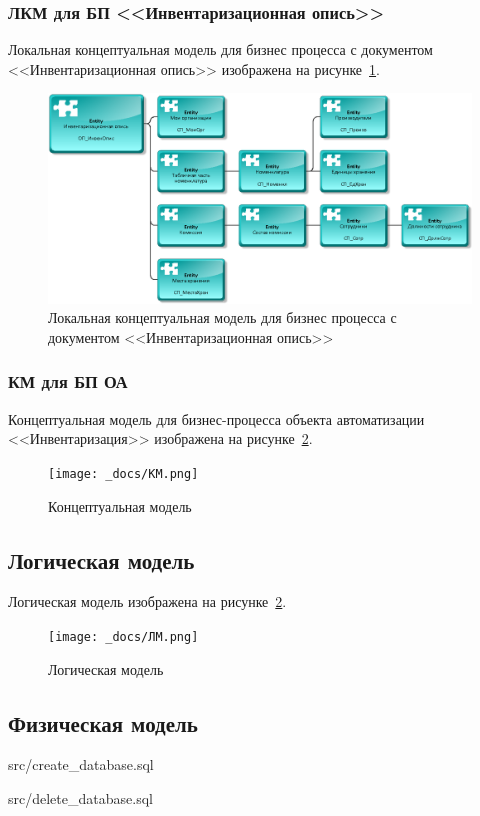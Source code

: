 \newpage

\subsubsection{ЛКМ для БП <<Инвентаризационная опись>>}

Локальная концептуальная модель для бизнес процесса с документом <<Инвентаризационная опись>>
изображена на рисунке~\ref{fig:LKM_InvenOpis}.

\begin{figure}[!h]
    \centering
    \includegraphics[width=18cm]
        {_docs/ЛКМ_ИнвенОпис.png}
    \caption{Локальная концептуальная модель для бизнес процесса с документом <<Инвентаризационная опись>>}
    \label{fig:LKM_InvenOpis}
\end{figure}

\newpage
\subsubsection{КМ для БП ОА}

Концептуальная модель для бизнес-процесса объекта автоматизации <<Инвентаризация>>
изображена на рисунке~\ref{fig:KM}.

\begin{figure}[!h]
    \centering
    \texttt{[image: \_docs/КМ.png]}
    \caption{Концептуальная модель}
    \label{fig:KM}
\end{figure}

\newpage
\subsection{Логическая модель}

Логическая модель 
изображена на рисунке~\ref{fig:KM}.

\begin{figure}[!h]
    \centering
    \texttt{[image: \_docs/ЛМ.png]}
    \caption{Логическая модель}
    \label{fig:LM}
\end{figure}

\newpage
\subsection{Физическая модель}


    {src/create_database.sql}


    {src/delete_database.sql}

\newpage
